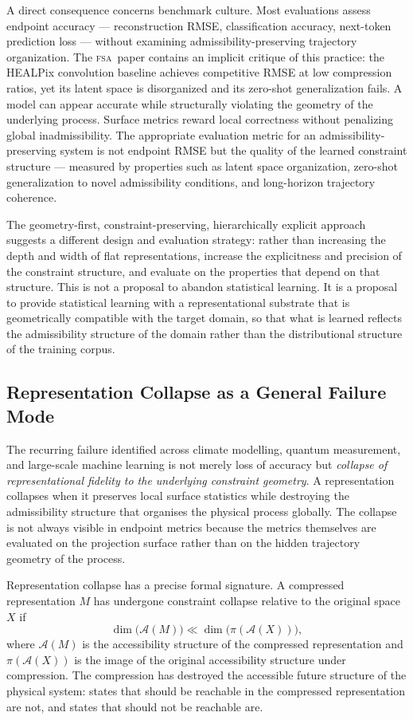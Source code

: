 \documentclass[11pt,a4paper]{article}
\theoremstyle{plain}
\theoremstyle{definition}
\theoremstyle{remark}
\newcommand{\A}{\mathcal{A}}
\newcommand{\FSA}{\textup{\textsc{fsa}}}
\begin{document}
A direct consequence concerns benchmark culture. Most evaluations assess
endpoint accuracy --- reconstruction RMSE, classification accuracy, next-token
prediction loss --- without examining admissibility-preserving trajectory
organization. The \FSA\ paper contains an implicit critique of this practice:
the HEALPix convolution baseline achieves competitive RMSE at low
compression ratios, yet its latent space is disorganized and its zero-shot
generalization fails. A model can appear accurate while structurally
violating the geometry of the underlying process. Surface metrics reward
local correctness without penalizing global inadmissibility. The appropriate
evaluation metric for an admissibility-preserving system is not endpoint
RMSE but the quality of the learned constraint structure --- measured by
properties such as latent space organization, zero-shot generalization to
novel admissibility conditions, and long-horizon trajectory coherence.

The geometry-first, constraint-preserving, hierarchically explicit approach
suggests a different design and evaluation strategy: rather than increasing
the depth and width of flat representations, increase the explicitness and
precision of the constraint structure, and evaluate on the properties that
depend on that structure. This is not a proposal to abandon statistical
learning. It is a proposal to provide statistical learning with a
representational substrate that is geometrically compatible with the target
domain, so that what is learned reflects the admissibility structure of the
domain rather than the distributional structure of the training corpus.

\subsection{Representation Collapse as a General Failure Mode}

The recurring failure identified across climate modelling, quantum
measurement, and large-scale machine learning is not merely loss of accuracy
but \textit{collapse of representational fidelity to the underlying
constraint geometry}. A representation collapses when it preserves local
surface statistics while destroying the admissibility structure that
organises the physical process globally. The collapse is not always visible
in endpoint metrics because the metrics themselves are evaluated on the
projection surface rather than on the hidden trajectory geometry of the
process.

Representation collapse has a precise formal signature. A compressed
representation $M$ has undergone constraint collapse relative to the
original space $X$ if
\[
\dim\bigl(\A(M)\bigr) \ll \dim\bigl(\pi(\A(X))\bigr),
\]
where $\A(M)$ is the accessibility structure of the compressed
representation and $\pi(\A(X))$ is the image of the original accessibility
structure under compression. The compression has destroyed the accessible
future structure of the physical system: states that should be reachable
in the compressed representation are not, and states that should not be
reachable are.
\end{document}
